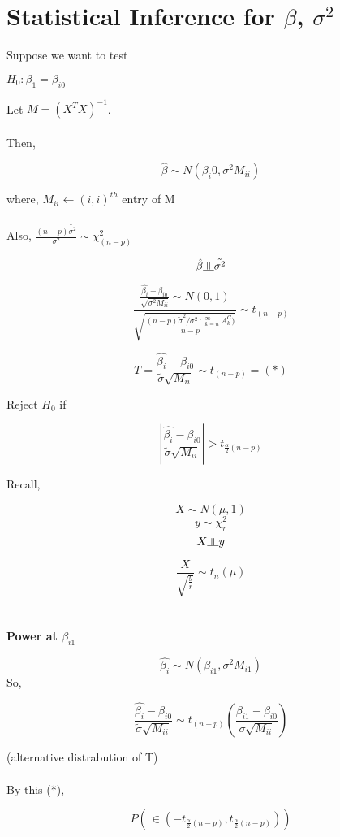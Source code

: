 \documentclass[11pt,fleqn]{book} %
\newcommand{\indep}{\rotatebox[origin=c]{90}{$\models$}}
\begin{document}
\section{Statistical Inference for $\beta$, $\sigma^2$}

Suppose we want to test 

$H_0: \beta_1 = \beta_{i0}$

Let $M = (X^TX)^{-1}$.\\
\\
Then, 

	$$\hat{\beta} \sim N(\beta_i0, \sigma^2 M_{ii}) $$

where, $M_{ii} \leftarrow (i,i)^{th}$ entry of M\\
\\

Also,  $\frac{(n-p)\tilde{\sigma^2}}{\sigma^2} \sim \chi^2_{(n-p)}$

$$\hat{\beta} \indep \tilde{\sigma^2} $$


$$\frac{\frac{\hat{\beta_i}- \beta_{i0}}{\sqrt{\sigma^2 M_{ii}}} \sim N(0,1) }{\sqrt{\frac{(n-p) \tilde{\sigma}^2 / \sigma^2\cap^\infty_{k=n} A_k^C )}{n-p}}} \sim t_{(n-p)}$$

$$T = \frac{\hat{\beta_i} - \beta_{i0}}{\tilde{\sigma} \sqrt{M_{ii}}} \sim t_{(n-p)} = (*)$$

Reject $H_0$ if 

$$\left|\frac{\hat{\beta_i} - \beta_{i0}}{\tilde{\sigma} \sqrt{M_{ii}}} \right| > t_{\frac{\alpha}{2}(n-p)} $$


Recall, 


$$X \sim N(\mu, 1)$$
$$y \sim \chi^2_r$$
$$X \indep y$$

$$\frac{X}{\sqrt{\frac{y}{r}}} \sim t_n(\mu)$$\\
\\

\textbf{Power at $\beta_{i1}$}

$$\hat{\beta_i} \sim N(\beta_{i1}, \sigma^2 M_{i1})$$
So, 

$$ \frac{\hat{\beta_i} - \beta_{i0}}{\tilde{\sigma} \sqrt{M_{ii}}} \sim t_{(n-p)}(\frac{\beta_{i1} - \beta_{i0}}{\sigma \sqrt{M_{ii}}})$$

(alternative distrabution of T)\\
\\
By this (*), 

$$P(\frac{}{} \in (-t_{\frac{\alpha}{2}(n-p)}, t_{\frac{\alpha}{2}(n-p)})) $$
\end{document}
